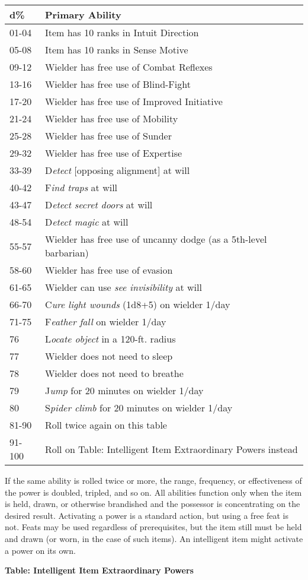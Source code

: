 \documentclass{article}
\begin{document}
\begin{tabular}{|>{\raggedright}p{28pt}|>{\raggedright}p{257pt}|}
\hline
d\textbf{\%} & P\textbf{rimary Ability}\tabularnewline
\hline
01-04 & Item has 10 ranks in Intuit Direction \tabularnewline
\hline
05-08 & Item has 10 ranks in Sense Motive \tabularnewline
\hline
09-12 & Wielder has free use of Combat Reflexes \tabularnewline
\hline
13-16 & Wielder has free use of Blind-Fight \tabularnewline
\hline
17-20 & Wielder has free use of Improved Initiative \tabularnewline
\hline
21-24 & Wielder has free use of Mobility \tabularnewline
\hline
25-28 & Wielder has free use of Sunder \tabularnewline
\hline
29-32 & Wielder has free use of Expertise \tabularnewline
\hline
33-39 & D\textit{etect }[opposing alignment] at will \tabularnewline
\hline
40-42 & F\textit{ind traps }at will \tabularnewline
\hline
43-47 & D\textit{etect secret doors }at will \tabularnewline
\hline
48-54 & D\textit{etect magic }at will \tabularnewline
\hline
55-57 & Wielder has free use of uncanny dodge (as a 5th-level barbarian) \tabularnewline
\hline
58-60 & Wielder has free use of evasion \tabularnewline
\hline
61-65 & Wielder can use \textit{see invisibility }at will \tabularnewline
\hline
66-70 & C\textit{ure light wounds }(1d8+5) on wielder 1/day \tabularnewline
\hline
71-75 & F\textit{eather fall }on wielder 1/day \tabularnewline
\hline
76 & L\textit{ocate object }in a 120-ft. radius \tabularnewline
\hline
77 & Wielder does not need to sleep \tabularnewline
\hline
78 & Wielder does not need to breathe \tabularnewline
\hline
79 & J\textit{ump }for 20 minutes on wielder 1/day \tabularnewline
\hline
80 & S\textit{pider climb }for 20 minutes on wielder 1/day \tabularnewline
\hline
81-90 & Roll twice again on this table \tabularnewline
\hline
91-100 & Roll on Table: Intelligent Item Extraordinary Powers instead \tabularnewline
\hline
\end{tabular}

\vspace{12pt}
If the same ability is rolled twice or more, the range, frequency, or effectiveness 
of the power is doubled, tripled, and so on. All abilities function only when the 
item is held, drawn, or otherwise brandished and the possessor is concentrating 
on the desired result. Activating a power is a standard action, but using a free 
feat is not. Feats may be used regardless of prerequisites, but the item still 
must be held and drawn (or worn, in the case of such items). An intelligent item 
might activate a power on its own. 

\vspace{12pt}
\textbf{Table: Intelligent Item Extraordinary Powers }
\end{document}
